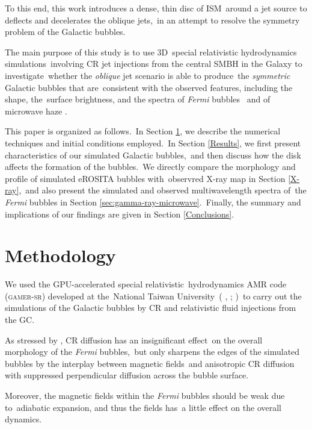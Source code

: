 \documentclass[fleqn,usenatbib,useAMS]{mnras}
\begin{document}
To this end, this work introduces a dense, thin disc of ISM\
around a jet source to deflects and decelerates the oblique jets,\
in an attempt to resolve the symmetry problem of the Galactic bubbles.\

The main purpose of this study is to use 3D\
special relativistic hydrodynamics simulations\
involving CR jet injections from the central SMBH in the Galaxy to investigate\
whether the \textit{oblique} jet scenario is able to produce\
the \textit{symmetric} Galactic bubbles that are\
consistent with the observed features, including the shape, the\
surface brightness, and the spectra of \textit{Fermi} bubbles \citep{Ackermann2014}\
and of microwave haze \citep{Dobler_2008,PlanckCollaborationIX2013}.

This paper is organized as follows.\
In Section \ref{Methodology}, we describe the numerical techniques and initial conditions employed.\
In Section \ref{Results}, we first present characteristics of our simulated Galactic bubbles,\
and then discuss how the disk affects the formation of the bubbles.\
We directly compare the morphology and profile of simulated eROSITA bubbles with\
observred X-ray map in Section \ref{X-ray},\
and also present the simulated and observed multiwavelength spectra of\
the \textit{Fermi} bubbles in Section \ref{sec:gamma-ray-microwave}.\
Finally, the summary and implications of our findings are given in Section \ref{Conclusions}.

\section{Methodology}
\label{Methodology}
  We used the GPU-accelerated special relativistic\
  hydrodynamics AMR code (\textsc{gamer-sr}) developed at the\
  National Taiwan University\
  (\citeauthor{gamer-1} \citeyear{gamer-1}, \citeyear{gamer-2}; \citeauthor{tseng2021} \citeyear{tseng2021})\
  to carry out the simulations of the Galactic bubbles by CR and relativistic fluid injections from the GC.

  As stressed by \citet{Yang2012}, CR diffusion has an insignificant effect\
  on the overall morphology of the \textit{Fermi} bubbles,\
  but only sharpens the edges of the simulated bubbles by the interplay between magnetic fields\
  and anisotropic CR diffusion with suppressed perpendicular diffusion across the bubble surface.

  Moreover, the magnetic fields within the \textit{Fermi} bubbles should be weak due to\
  adiabatic expansion, and thus the fields has\
  a little effect on the overall dynamics.
\end{document}
